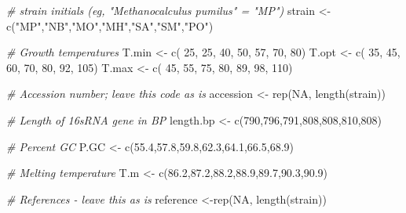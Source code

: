 \documentclass[
]{book}
\newenvironment{Shaded}{\begin{snugshade}}{\end{snugshade}}
\newcommand{\CommentTok}[1]{\textcolor[rgb]{0.56,0.35,0.01}{\textit{#1}}}
\newcommand{\ConstantTok}[1]{\textcolor[rgb]{0.00,0.00,0.00}{#1}}
\newcommand{\DecValTok}[1]{\textcolor[rgb]{0.00,0.00,0.81}{#1}}
\newcommand{\FloatTok}[1]{\textcolor[rgb]{0.00,0.00,0.81}{#1}}
\newcommand{\FunctionTok}[1]{\textcolor[rgb]{0.00,0.00,0.00}{#1}}
\newcommand{\NormalTok}[1]{#1}
\newcommand{\OtherTok}[1]{\textcolor[rgb]{0.56,0.35,0.01}{#1}}
\newcommand{\StringTok}[1]{\textcolor[rgb]{0.31,0.60,0.02}{#1}}
\begin{document}
\begin{Shaded}
\begin{Highlighting}[]
\CommentTok{\# strain initials (eg, "Methanocalculus pumilus" = "MP")}
\NormalTok{strain    }\OtherTok{\textless{}{-}} \FunctionTok{c}\NormalTok{(}\StringTok{"MP"}\NormalTok{,}\StringTok{"NB"}\NormalTok{,}\StringTok{"MO"}\NormalTok{,}\StringTok{"MH"}\NormalTok{,}\StringTok{"SA"}\NormalTok{,}\StringTok{"SM"}\NormalTok{,}\StringTok{"PO"}\NormalTok{)}

\CommentTok{\# Growth temperatures}
\NormalTok{T.min     }\OtherTok{\textless{}{-}} \FunctionTok{c}\NormalTok{( }\DecValTok{25}\NormalTok{,  }\DecValTok{25}\NormalTok{,  }\DecValTok{40}\NormalTok{,  }\DecValTok{50}\NormalTok{,  }\DecValTok{57}\NormalTok{,  }\DecValTok{70}\NormalTok{,  }\DecValTok{80}\NormalTok{)}
\NormalTok{T.opt     }\OtherTok{\textless{}{-}} \FunctionTok{c}\NormalTok{( }\DecValTok{35}\NormalTok{,  }\DecValTok{45}\NormalTok{,  }\DecValTok{60}\NormalTok{,  }\DecValTok{70}\NormalTok{,  }\DecValTok{80}\NormalTok{,  }\DecValTok{92}\NormalTok{,  }\DecValTok{105}\NormalTok{)}
\NormalTok{T.max     }\OtherTok{\textless{}{-}} \FunctionTok{c}\NormalTok{( }\DecValTok{45}\NormalTok{,  }\DecValTok{55}\NormalTok{,  }\DecValTok{75}\NormalTok{,  }\DecValTok{80}\NormalTok{,  }\DecValTok{89}\NormalTok{,  }\DecValTok{98}\NormalTok{,  }\DecValTok{110}\NormalTok{)}

\CommentTok{\# Accession number; leave this code as is}
\NormalTok{accession }\OtherTok{\textless{}{-}} \FunctionTok{rep}\NormalTok{(}\ConstantTok{NA}\NormalTok{, }\FunctionTok{length}\NormalTok{(strain))}

\CommentTok{\# Length of 16sRNA gene in BP}
\NormalTok{length.bp }\OtherTok{\textless{}{-}} \FunctionTok{c}\NormalTok{(}\DecValTok{790}\NormalTok{,}\DecValTok{796}\NormalTok{,}\DecValTok{791}\NormalTok{,}\DecValTok{808}\NormalTok{,}\DecValTok{808}\NormalTok{,}\DecValTok{810}\NormalTok{,}\DecValTok{808}\NormalTok{)}

\CommentTok{\# Percent GC}
\NormalTok{P.GC      }\OtherTok{\textless{}{-}} \FunctionTok{c}\NormalTok{(}\FloatTok{55.4}\NormalTok{,}\FloatTok{57.8}\NormalTok{,}\FloatTok{59.8}\NormalTok{,}\FloatTok{62.3}\NormalTok{,}\FloatTok{64.1}\NormalTok{,}\FloatTok{66.5}\NormalTok{,}\FloatTok{68.9}\NormalTok{)}

\CommentTok{\# Melting temperature}
\NormalTok{T.m       }\OtherTok{\textless{}{-}} \FunctionTok{c}\NormalTok{(}\FloatTok{86.2}\NormalTok{,}\FloatTok{87.2}\NormalTok{,}\FloatTok{88.2}\NormalTok{,}\FloatTok{88.9}\NormalTok{,}\FloatTok{89.7}\NormalTok{,}\FloatTok{90.3}\NormalTok{,}\FloatTok{90.9}\NormalTok{)}

\CommentTok{\# References {-} leave this as is}
\NormalTok{reference }\OtherTok{\textless{}{-}}\FunctionTok{rep}\NormalTok{(}\ConstantTok{NA}\NormalTok{, }\FunctionTok{length}\NormalTok{(strain))}
\end{Highlighting}
\end{Shaded}
\end{document}
